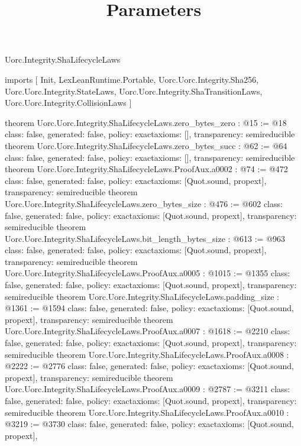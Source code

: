 \begin{lexlean}{Uorc.Integrity.ShaLifecycleLaws}
\title{Parameters}
\begin{coremodule}
imports [
  Init,
  LexLeanRuntime.Portable,
  Uorc.Uorc.Integrity.Sha256,
  Uorc.Uorc.Integrity.StateLaws,
  Uorc.Uorc.Integrity.ShaTransitionLaws,
  Uorc.Uorc.Integrity.CollisionLaws
]

theorem Uorc.Uorc.Integrity.ShaLifecycleLaws.zero_bytes_zero : @15 := @18 {
  class: false,
  generated: false,
  policy: exact{axioms: []},
  transparency: semireducible
}
theorem Uorc.Uorc.Integrity.ShaLifecycleLaws.zero_bytes_succ : @62 := @64 {
  class: false,
  generated: false,
  policy: exact{axioms: []},
  transparency: semireducible
}
theorem Uorc.Uorc.Integrity.ShaLifecycleLaws.ProofAux.a0002 : @74 := @472 {
  class: false,
  generated: false,
  policy: exact{axioms: [Quot.sound, propext]},
  transparency: semireducible
}
theorem Uorc.Uorc.Integrity.ShaLifecycleLaws.zero_bytes_size : @476 := @602 {
  class: false,
  generated: false,
  policy: exact{axioms: [Quot.sound, propext]},
  transparency: semireducible
}
theorem Uorc.Uorc.Integrity.ShaLifecycleLaws.bit_length_bytes_size : @613 := @963 {
  class: false,
  generated: false,
  policy: exact{axioms: [Quot.sound, propext]},
  transparency: semireducible
}
theorem Uorc.Uorc.Integrity.ShaLifecycleLaws.ProofAux.a0005 : @1015 := @1355 {
  class: false,
  generated: false,
  policy: exact{axioms: [Quot.sound, propext]},
  transparency: semireducible
}
theorem Uorc.Uorc.Integrity.ShaLifecycleLaws.padding_size : @1361 := @1594 {
  class: false,
  generated: false,
  policy: exact{axioms: [Quot.sound, propext]},
  transparency: semireducible
}
theorem Uorc.Uorc.Integrity.ShaLifecycleLaws.ProofAux.a0007 : @1618 := @2210 {
  class: false,
  generated: false,
  policy: exact{axioms: [Quot.sound, propext]},
  transparency: semireducible
}
theorem Uorc.Uorc.Integrity.ShaLifecycleLaws.ProofAux.a0008 : @2222 := @2776 {
  class: false,
  generated: false,
  policy: exact{axioms: [Quot.sound, propext]},
  transparency: semireducible
}
theorem Uorc.Uorc.Integrity.ShaLifecycleLaws.ProofAux.a0009 : @2787 := @3211 {
  class: false,
  generated: false,
  policy: exact{axioms: [Quot.sound, propext]},
  transparency: semireducible
}
theorem Uorc.Uorc.Integrity.ShaLifecycleLaws.ProofAux.a0010 : @3219 := @3730 {
  class: false,
  generated: false,
  policy: exact{axioms: [Quot.sound, propext]},
}
\end{coremodule}
\end{lexlean}
